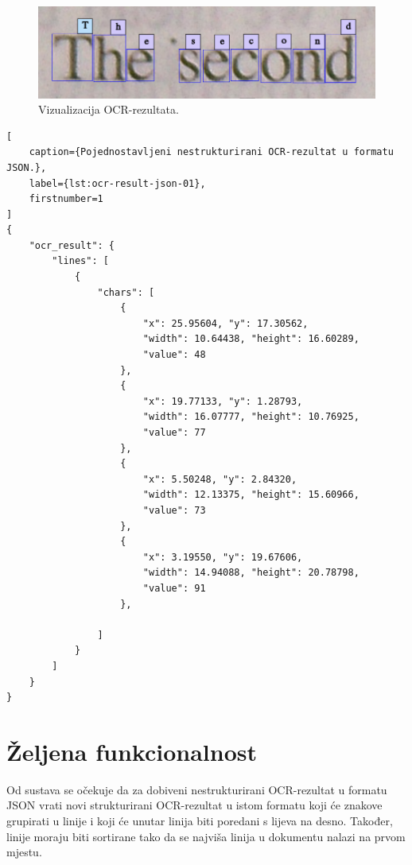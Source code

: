 \documentclass[times, utf8, zavrsni]{fer}
\begin{document}
\

\begin{figure}[htb]
    \centering
    \includegraphics[width=\textwidth]{images/book-example-02.png}
    \caption{Vizualizacija OCR-rezultata.}
    \label{fig:book-example-02}
\end{figure}

\pagebreak

\begin{lstlisting}[
    caption={Pojednostavljeni nestrukturirani OCR-rezultat u formatu JSON.},
    label={lst:ocr-result-json-01},
    firstnumber=1
]
{
    "ocr_result": {
        "lines": [
            {
                "chars": [
                    {
                        "x": 25.95604, "y": 17.30562,
                        "width": 10.64438, "height": 16.60289,
                        "value": 48
                    },
                    {
                        "x": 19.77133, "y": 1.28793,
                        "width": 16.07777, "height": 10.76925,
                        "value": 77
                    },
                    {
                        "x": 5.50248, "y": 2.84320,
                        "width": 12.13375, "height": 15.60966,
                        "value": 73
                    },
                    {
                        "x": 3.19550, "y": 19.67606,
                        "width": 14.94088, "height": 20.78798,
                        "value": 91
                    },

                ]
            }
        ]
    }
}
\end{lstlisting}

\pagebreak








\section{Željena funkcionalnost}
\label{sec:željena-funkcionalnost}
Od sustava se očekuje da za dobiveni nestrukturirani OCR-rezultat u formatu
JSON vrati novi strukturirani OCR-rezultat u istom formatu koji će znakove
grupirati u linije i koji će unutar linija biti poredani s lijeva na desno.
Također, linije moraju biti sortirane tako da se najviša linija u dokumentu
nalazi na prvom mjestu.
\end{document}
